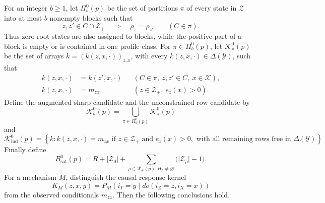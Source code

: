For an integer \(b\geq1\), let \(\Pi_b^0(p)\) be the set of partitions
\(\pi\) of every state in \(\mathcal Z\) into at most \(b\) nonempty
blocks such that
\[
 z,z'\in C\cap\mathcal Z_+\quad\Longrightarrow\quad \rho_z=\rho_{z'}
 \qquad(C\in\pi).
\]
Thus zero-root states are also assigned to blocks, while the positive
part of a block is empty or is contained in one profile class.  For
\(\pi\in\Pi_b^0(p)\), let \(\mathcal K_\pi^0(p)\) be the set of arrays
\(k=(k(z,x,\cdot))_{z,x}\), with every
\(k(z,x,\cdot)\in\Delta(\mathcal Y)\), such that
\[
 \begin{split}
 k(z,x,\cdot)&=k(z',x,\cdot)
 &&(C\in\pi,\ z,z'\in C,\ x\in\mathcal X),\\
 k(z,x,\cdot)&=m_{zx}
 &&(z\in\mathcal Z_+,\ e_z(x)>0).
 \end{split}
\]
Define the augmented sharp candidate and the unconstrained-row candidate
by
\[
 \mathcal K_b^0(p)=\bigcup_{\pi\in\Pi_b^0(p)}\mathcal K_\pi^0(p)
\]
and
\[
 \mathcal K_{\mathrm{ind}}^0(p)
 =\left\{k:
 k(z,x,\cdot)=m_{zx}\text{ if }z\in\mathcal Z_+
 \text{ and }e_z(x)>0,
 \text{ with all remaining rows free in }\Delta(\mathcal Y)
 \right\}.
\]
Finally define
\[
 B_{\mathrm{sat}}^0(p)
 =R+\lvert\mathcal Z_0\rvert+
 \sum_{\rho\in\mathcal R_+(p):H_\rho\ne\varnothing}
 \bigl(\lvert\mathcal Z_\rho\rvert-1\bigr).
\]
For a mechanism \(M\), distinguish the causal response kernel
\[
 K_M(z,x,y)=P_M(i_Y=y\mid do(i_Z=z,i_X=x))
\]
from the observed conditionals \(m_{zx}\).  Then the following conclusions
hold.
